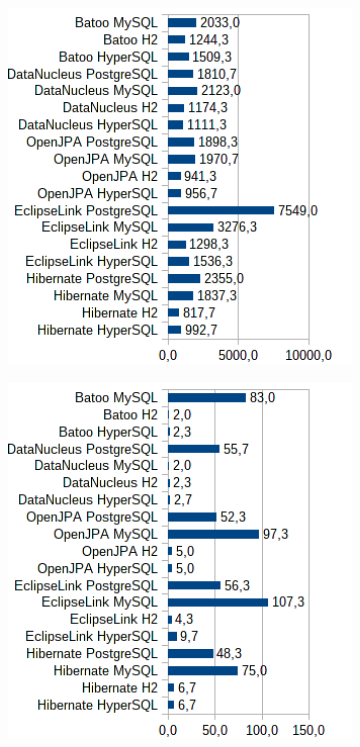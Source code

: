 \begin{figure}[!h]
\begin{subfigure}[b]{1\textwidth}
\includegraphics[width=25em]{obr/bench/jpa9}
\end{subfigure}
\begin{subfigure}[b]{1\textwidth}
\includegraphics[width=25em]{obr/bench/jpa10}
\end{subfigure}
\end{figure}

